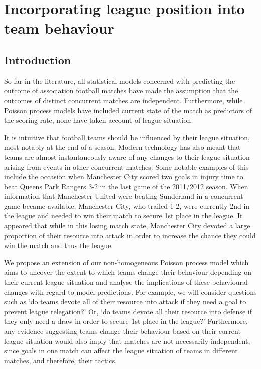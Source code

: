 
\singlespacing

\chapter{Incorporating league position into team behaviour}
\label{ch:A_Utility_Based_Model}

\onehalfspacing

\section{Introduction}

So far in the literature, all statistical models concerned with predicting the outcome of association football matches
have made the assumption that the outcomes of distinct concurrent matches are independent. Furthermore, while Poisson
process models have included current state of the match as predictors of the scoring rate, none have
taken account of league situation.

It is intuitive that football teams should be influenced by their league situation, most notably at the end of a season.
Modern technology has also meant that teams are almost instantaneously aware of any changes to their league situation
arising from events in other concurrent matches. Some notable examples of this include the occasion when Manchester City
scored two goals in injury time to beat Queens Park Rangers 3-2 in the last game of the 2011/2012 season. When
information that Manchester United were beating Sunderland in a concurrent game became available, Manchester City, who
trailed 1-2, were currently 2nd in the league and needed to win their match to secure 1st place in the league. It
appeared that while in this losing match state, Manchester City devoted a large proportion of their resource into attack
in order to increase the chance they could win the match and thus the league.

We propose an extension of our non-homogeneous Poisson process model which aims to uncover the extent to which teams
change their behaviour depending on their current league situation and analyse the implications of these behavioural
changes with regard to model predictions. For example, we will consider questions such as `do teams devote all of their
resource into attack if they need a goal to prevent league relegation?' Or, `do teams devote all their resource into
defense if they only need a draw in order to secure 1st place in the league?' Furthermore, any evidence suggesting teams
change their behaviour based on their current league situation would also imply that matches are not necessarily
independent, since goals in one match can affect the league situation of teams in different matches, and therefore,
their tactics.

